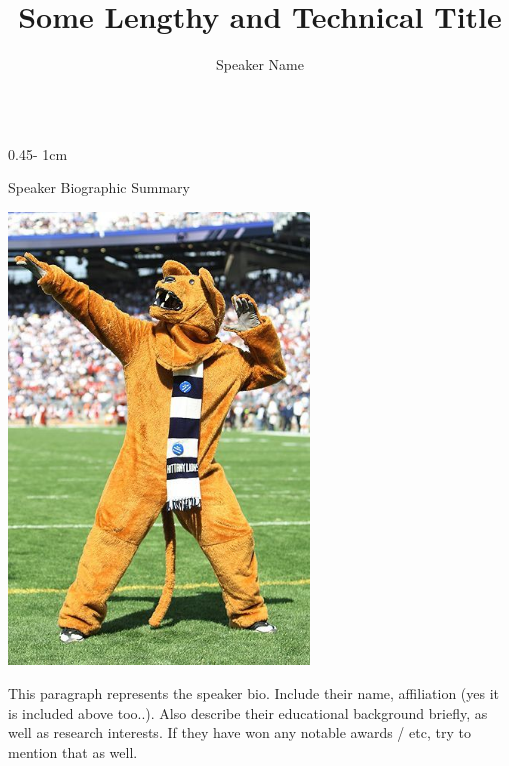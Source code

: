 \documentclass{psuposter}
\title{Some Lengthy and Technical Title}
\author{Speaker Name\inst{1}}
\institute{\inst{1} University of Speaker, Department of Speaker}
\begin{document}
\begin{frame}
\begin{columns}
\begin{column}{0.45\textwidth - 1cm}

    \begin{block}{Speaker Biographic Summary}
    	\begin{center}
	    	\includegraphics[width=0.6\textwidth]{template-images/lion}    		
    	\end{center}
        This paragraph represents the speaker bio. Include their name, affiliation (yes it is included above too..). Also describe their educational background briefly, as well as research interests. If they have won any notable awards / etc, try to mention that as well.
    \end{block}



\end{column}
\end{columns}
\end{frame}
\end{document}
